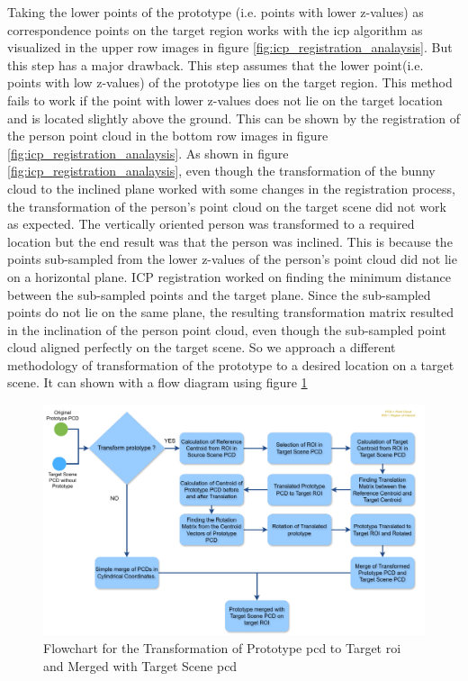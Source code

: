 Taking the lower points of the prototype (i.e. points with lower z-values) as correspondence points on the target region works with the \acrshort{icp} algorithm as visualized in the upper row images in figure \ref{fig:icp_registration_analaysis}. But this step has a major drawback. This step assumes that the lower point(i.e. points with low z-values) of the prototype lies on the target region. This method fails to work if the point with lower z-values does not lie on the target location and is located slightly above the ground. This can be shown by the registration of the person point cloud in the bottom row images in figure \ref{fig:icp_registration_analaysis}.
As shown in figure \ref{fig:icp_registration_analaysis}, even though the transformation of the bunny cloud to the inclined plane worked with some changes in the registration process, the transformation of the person's point cloud on the target scene did not work as expected. The vertically oriented person was transformed to a required location but the end result was that the person was inclined. This is because the points sub-sampled from the lower z-values of the person's point cloud did not lie on a horizontal plane. ICP registration worked on finding the minimum distance between the sub-sampled points and the target plane. Since the sub-sampled points do not lie on the same plane, the resulting transformation matrix resulted in the inclination of the person point cloud, even though the sub-sampled point cloud aligned perfectly on the target scene. So we approach a different methodology of transformation of the prototype to a desired location on a target scene. It can shown with a flow diagram using figure \ref{fig:prototype_transform_and_merge}

\begin{figure}[htbp]
    \centering
    \includegraphics[width=1\linewidth]{97_graphics/concepts/prototype_extraction.pdf}
    \caption{Flowchart for the Transformation of Prototype \acrshort{pcd} to Target \acrshort{roi} and Merged with Target Scene \acrshort{pcd}}
    \label{fig:prototype_transform_and_merge}
\end{figure}

